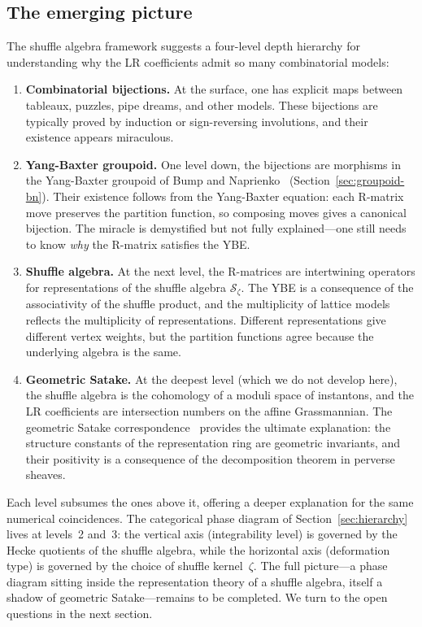 \subsection{The emerging picture}

The shuffle algebra framework suggests a four-level depth hierarchy
for understanding why the LR coefficients admit so many combinatorial
models:

\begin{enumerate}
\item \textbf{Combinatorial bijections.}  At the surface, one has
  explicit maps between tableaux, puzzles, pipe dreams, and other
  models.  These bijections are typically proved by induction or
  sign-reversing involutions, and their existence appears miraculous.

\item \textbf{Yang-Baxter groupoid.}  One level down, the bijections
  are morphisms in the Yang-Baxter groupoid of Bump and
  Naprienko~\cite{bump-naprienko-2025}
  (Section~\ref{sec:groupoid-bn}).  Their existence follows from the
  Yang-Baxter equation: each R-matrix move preserves the partition
  function, so composing moves gives a canonical bijection.  The
  miracle is demystified but not fully explained---one still needs to
  know \emph{why} the R-matrix satisfies the YBE.

\item \textbf{Shuffle algebra.}  At the next level, the R-matrices
  are intertwining operators for representations of the shuffle
  algebra $\mathcal{S}_\zeta$.  The YBE is a consequence of the
  associativity of the shuffle product, and the multiplicity of
  lattice models reflects the multiplicity of representations.
  Different representations give different vertex weights, but the
  partition functions agree because the underlying algebra is the
  same.

\item \textbf{Geometric Satake.}  At the deepest level (which we do
  not develop here), the shuffle algebra is the cohomology of a
  moduli space of instantons, and the LR coefficients are intersection
  numbers on the affine Grassmannian.  The geometric Satake
  correspondence~\cite{mirkovic-vilonen-2007} provides the ultimate
  explanation: the structure constants of the representation ring are
  geometric invariants, and their positivity is a consequence of the
  decomposition theorem in perverse sheaves.
\end{enumerate}

\noindent
Each level subsumes the ones above it, offering a deeper explanation
for the same numerical coincidences.  The categorical phase diagram of
Section~\ref{sec:hierarchy} lives at levels~2 and~3: the vertical
axis (integrability level) is governed by the Hecke quotients of the
shuffle algebra, while the horizontal axis (deformation type) is
governed by the choice of shuffle kernel~$\zeta$.  The full picture---a
phase diagram sitting inside the representation theory of a shuffle
algebra, itself a shadow of geometric Satake---remains to be completed.
We turn to the open questions in the next section.
